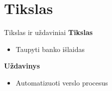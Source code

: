 \section{Tikslas}

\begin{frame}[c]{Tikslas ir uždaviniai}    
    {\bf}
    {\bf Tikslas}
    \begin{itemize}
        \item Taupyti banko išlaidas
    \end{itemize}
    \vspace{1cm}
    {\bf Uždavinys}
    \begin{itemize}
        \item Automatizuoti verslo procesus
    \end{itemize}
\end{frame}